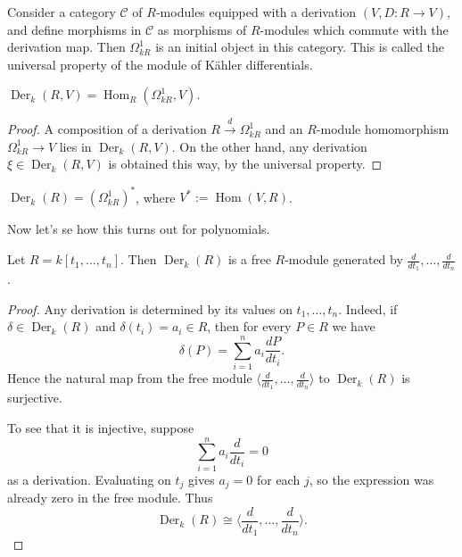 \begin{remark}
\label{remark-universal-property-kahler-differentials}
Consider a category $\mathcal C$ of
$R$-modules equipped with a derivation
$(V,D:R\to V)$, and define morphisms in
$\mathcal C$ as morphisms of $R$-modules
which commute with the derivation map.
Then $\Omega^1_{kR}$ is an initial object
in this category. This is called the
universal property of the module of
K\"ahler differentials.
\end{remark}

\begin{lemma}
\label{lemma-derivations-hom}
$\operatorname{Der}_k(R,V)
=\operatorname{Hom}_R(\Omega^1_{kR},V)$.
\end{lemma}

\begin{proof}
A composition of a derivation
$R\xrightarrow{d}\Omega^1_{kR}$ and an
$R$-module homomorphism
$\Omega^1_{kR}\to V$ lies in
$\operatorname{Der}_k(R,V)$. On the other
hand, any derivation
$\xi\in\operatorname{Der}_k(R,V)$ is
obtained this way, by the universal
property.
\end{proof}

\begin{corollary}
\label{lemma-derivations-dual}
$\operatorname{Der}_k(R)
=(\Omega^1_{kR})^\ast$, where
$V^\ast:=\operatorname{Hom}(V,R)$.
\end{corollary}

\noindent
Now let's se how this turns out
for polynomials.

\begin{lemma}
\label{lemma-derivations-polynomial-ring}
Let $R=k[t_1,\dots,t_n]$.
Then $\operatorname{Der}_k(R)$ is a free
$R$-module generated by
$\frac{d}{dt_1},\dots,\frac{d}{dt_n}$.
\end{lemma}

\begin{proof}
Any derivation is determined by its values
on $t_1,\dots,t_n$. Indeed, if
$\delta\in\operatorname{Der}_k(R)$ and
$\delta(t_i)=a_i\in R$, then for every
$P\in R$ we have
$$
\delta(P)
=\sum_{i=1}^n a_i
\frac{dP}{dt_i}.
$$
Hence the natural map from the free module
$\langle \frac{d}{dt_1},\dots,\frac{d}{dt_n}
\rangle$ to $\operatorname{Der}_k(R)$ is
surjective.

To see that it is injective, suppose
$$
\sum_{i=1}^n a_i\frac{d}{dt_i}=0
$$
as a derivation. Evaluating on $t_j$ gives
$a_j=0$ for each $j$, so the expression was
already zero in the free module. Thus
\[
\operatorname{Der}_k(R)
\cong
\langle \frac{d}{dt_1},\dots,\frac{d}{dt_n}
\rangle.
\]
\end{proof}

